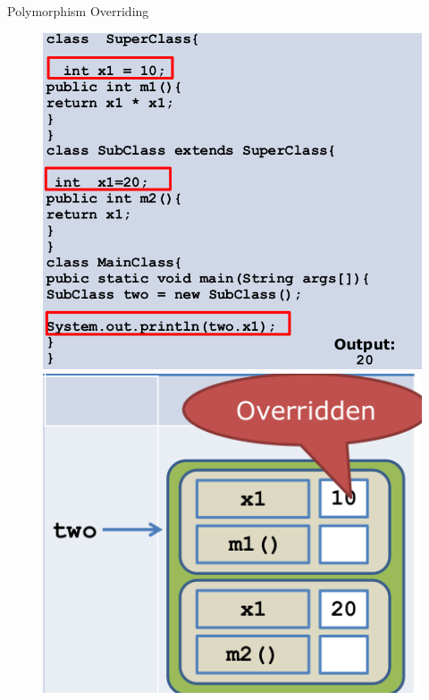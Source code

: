 \documentclass[14pt]{beamer}
\begin{document}
\begin{frame}[fragile]{Polymorphism}
 Overriding
 
 \begin{figure}[H]
\begin{minipage}[l]{0.5\linewidth}
\includegraphics[scale=.2]{polyoverride1.png}

\end{minipage}
\quad
\begin{minipage}[c]{0.3\textwidth}
\includegraphics[scale=.2]{polyoverride2.png}

\end{minipage}
\end{figure}
\end{frame}
\end{document}

